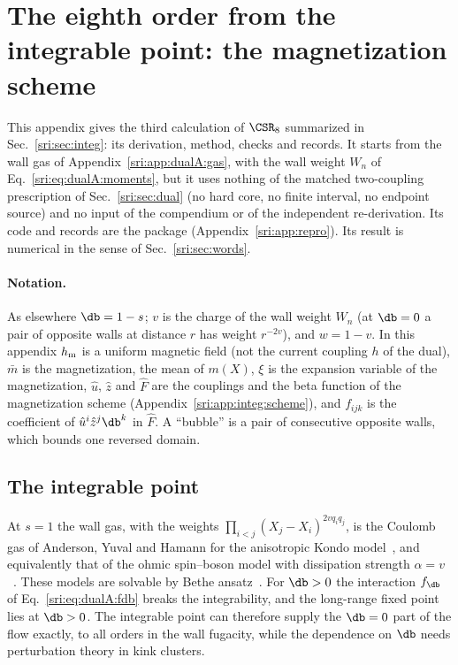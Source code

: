 \section{The eighth order from the integrable point: the magnetization scheme}\label{sri:app:integ}
This appendix gives the third calculation of $\CSR_8$ summarized in Sec.~\ref{sri:sec:integ}: its derivation, method,
checks and records. It starts from the wall gas of Appendix~\ref{sri:app:dualA:gas}, with the wall weight $W_n$ of
Eq.~\eqref{sri:eq:dualA:moments}, but it uses nothing of the matched two-coupling prescription of Sec.~\ref{sri:sec:dual} (no
hard core, no finite interval, no endpoint source) and no input of the compendium or of the independent
re-derivation. Its code and records are the package  (Appendix~\ref{sri:app:repro}). Its result is
numerical in the sense of Sec.~\ref{sri:sec:words}.

\paragraph{Notation.} As elsewhere $\db=1-s$; $v$ is the charge of the wall weight $W_n$ (at $\db=0$ a pair of
opposite walls at distance $r$ has weight $r^{-2v}$), and $w=1-v$. In this appendix $h_{\rm m}$ is a uniform magnetic
field (not the current coupling $h$ of the dual), $\bar m$ is the magnetization, the mean of $m(X)$, $\xi$ is the
expansion variable of the magnetization, $\hat u$, $\hat z$ and $\hat F$ are the couplings and the beta function of
the magnetization scheme (Appendix~\ref{sri:app:integ:scheme}), and $f_{ijk}$ is the coefficient of $\hat u^i\hat
z^j\db^k$ in $\hat F$. A ``bubble'' is a pair of consecutive opposite walls, which bounds one reversed domain.

\subsection{The integrable point}\label{sri:app:integ:point}
At $s=1$ the wall gas, with the weights $\prod_{i<j}(X_j-X_i)^{2vq_iq_j}$, is the Coulomb gas of Anderson, Yuval and
Hamann for the anisotropic Kondo model~\cite{sri:Anderson:1969xx,sri:Anderson:1970kyb}, and equivalently that of the ohmic
spin--boson model with dissipation strength $\alpha=v$~\cite{sri:Leggett:1987zz}. These models are solvable by Bethe
ansatz~\cite{sri:Andrei:1983,sri:Tsvelick:1983}. For $\db>0$ the interaction $f_{\db}$ of Eq.~\eqref{sri:eq:dualA:fdb} breaks the
integrability, and the long-range fixed point lies at $\db>0$. The integrable point can therefore supply the $\db=0$
part of the flow exactly, to all orders in the wall fugacity, while the dependence on $\db$ needs perturbation theory
in kink clusters.

